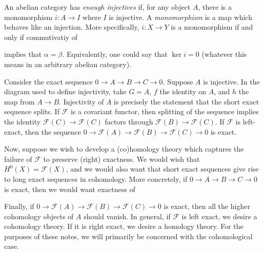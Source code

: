 An abelian category has \textit{enough injectives} if, for any object $A$, there
is a monomorphism $i : A \to I$ where $I$ is injective. A \textit{monomorphism}
is a map which behaves like an injection. More specifically, $i : X \to Y$ is a
monomorphism if and only if commutivatiy of
\begin{center}
\end{center}
implies that $\alpha = \beta$. Equivalently, one could say that $\ker{i} = 0$
(whatever this means in an arbitrary abelian category).

\begin{remark}
    Consider the exact sequence $0 \to A \to B \to C \to 0$. Suppose $A$ is
    injective. In the diagram used to define injectivity, take $G=A$, $f$ the
    identity on $A$, and $h$ the map from $A \to B$. Injectivity of $A$ is
    precisely the statement that the short exact sequence splits. If
    $\mathcal{F}$ is a covariant functor, then splitting of the sequence implies
    the identity $\mathcal{F}(C) \to \mathcal{F}(C)$ factors through
    $\mathcal{F}(B) \to \mathcal{F}(C)$. If $\mathcal{F}$ is left-exact, then
    the sequence $0 \to \mathcal{F}(A) \to \mathcal{F}(B) \to \mathcal{F}(C) \to
    0$ is exact.
\end{remark}

Now, suppose we wish to develop a (co)homology theory which captures the failure
of $\mathcal{F}$ to preserve (right) exactness. We would wish that
$H^0(X)=\mathcal{F}(X)$, and we would also want that short exact sequences give
rise to long exact sequences in cohomology. More concretely, if $0 \to A \to B
\to C \to 0$ is exact, then we would want exactness of
\begin{center}
\end{center}
Finally, if $0 \to \mathcal{F}(A) \to \mathcal{F}(B) \to \mathcal{F}(C) \to 0$
is exact, then all the higher cohomology objects of $A$ should vanish. In
general, if $\mathcal{F}$ is left exact, we desire a cohomology theory. If it is
right exact, we desire a homology theory. For the purposes of these notes, we
will primarily be concerned with the cohomological case.

